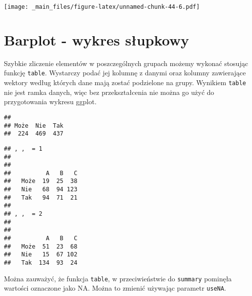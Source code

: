 \documentclass[
]{book}
\newenvironment{Shaded}{\begin{snugshade}}{\end{snugshade}}
\newcommand{\AttributeTok}[1]{\textcolor[rgb]{0.77,0.63,0.00}{#1}}
\newcommand{\FunctionTok}[1]{\textcolor[rgb]{0.00,0.00,0.00}{#1}}
\newcommand{\NormalTok}[1]{#1}
\newcommand{\SpecialCharTok}[1]{\textcolor[rgb]{0.00,0.00,0.00}{#1}}
\newcommand{\StringTok}[1]{\textcolor[rgb]{0.31,0.60,0.02}{#1}}
\begin{document}
\texttt{[image: \_main\_files/figure-latex/unnamed-chunk-44-6.pdf]}

\hypertarget{barplot---wykres-sux142upkowy}{%
\section{Barplot - wykres słupkowy}\label{barplot---wykres-sux142upkowy}}

Szybkie zliczenie elementów w poszczególnych grupach możemy wykonać stosując funkcję \texttt{table}. Wystarczy podać jej kolumnę z danymi oraz kolumny zawierające wektory według których dane mają zostać podzielone na grupy. Wynikiem \texttt{table} nie jest ramka danych, więc bez przekształcenia nie można go użyć do przygotowania wykresu ggplot.

\begin{Shaded}
\end{Shaded}

\begin{verbatim}
## 
## Może  Nie  Tak 
##  224  469  437
\end{verbatim}

\begin{Shaded}
\end{Shaded}

\begin{verbatim}
## , ,  = 1
## 
##       
##          A   B   C
##   Może  19  25  38
##   Nie   68  94 123
##   Tak   94  71  21
## 
## , ,  = 2
## 
##       
##          A   B   C
##   Może  51  23  68
##   Nie   15  67 102
##   Tak  134  93  24
\end{verbatim}

Można zauważyć, że funkcja \texttt{table}, w przeciwieństwie do \texttt{summary} pominęła wartości oznaczone jako NA. Można to zmienić używając parametr \texttt{useNA}.

\begin{Shaded}
\end{Shaded}
\end{document}
